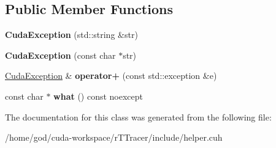 \subsection*{Public Member Functions}
\begin{DoxyCompactItemize}
\item 
{\bfseries Cuda\+Exception} (std\+::string \&str)\hypertarget{class_cuda_exception_a17f8e85766f624c09c901bcdd79d7042}{}\label{class_cuda_exception_a17f8e85766f624c09c901bcdd79d7042}

\item 
{\bfseries Cuda\+Exception} (const char $\ast$str)\hypertarget{class_cuda_exception_a0d89dc2c59c4b25590ed463554af284d}{}\label{class_cuda_exception_a0d89dc2c59c4b25590ed463554af284d}

\item 
\hyperlink{class_cuda_exception}{Cuda\+Exception} \& {\bfseries operator+} (const std\+::exception \&e)\hypertarget{class_cuda_exception_acf9ac22baa0064c2e2d44faa222324b4}{}\label{class_cuda_exception_acf9ac22baa0064c2e2d44faa222324b4}

\item 
const char $\ast$ {\bfseries what} () const noexcept\hypertarget{class_cuda_exception_a5392d02d126a57a15cef5ff922ecbe3b}{}\label{class_cuda_exception_a5392d02d126a57a15cef5ff922ecbe3b}

\end{DoxyCompactItemize}


The documentation for this class was generated from the following file\+:\begin{DoxyCompactItemize}
\item 
/home/god/cuda-\/workspace/r\+T\+Tracer/include/helper.\+cuh\end{DoxyCompactItemize}
